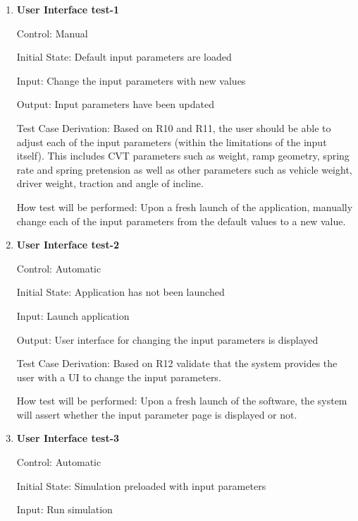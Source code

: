 \documentclass[12pt, titlepage]{article}
\begin{document}
\begin{enumerate}

  \item {} \hypertarget{User Interface test-1}{\textbf{User Interface test-1}} \label{User Interface test-1}
  
  Control: Manual

  Initial State: Default input parameters are loaded
            
  Input: Change the input parameters with new values
            
  Output: Input parameters have been updated 
  
  Test Case Derivation: Based on R10 and R11, the user should be able to adjust each of the input parameters (within the limitations of the input itself).
  This includes CVT parameters such as weight, ramp geometry, spring rate and spring pretension as well as other parameters such as vehicle weight, driver weight, traction and angle of incline. 
  
  How test will be performed: Upon a fresh launch of the application, manually change each of the input parameters from the default values to a new value. 
             
  \item {} \hypertarget{User Interface test-2}{\textbf{User Interface test-2}} \label{User Interface test-2}
 
  Control: Automatic
            
  Initial State: Application has not been launched
            
  Input: Launch application
            
  Output: User interface for changing the input parameters is displayed
  
  Test Case Derivation: Based on R12 validate that the system provides the user with a UI to change the input parameters.
  
  How test will be performed: Upon a fresh launch of the software, the system will assert whether the input parameter page is displayed or not. 
  \item {} \hypertarget{User Interface test-3}{\textbf{User Interface test-3}} \label{User Interface test-3}
  
  Control: Automatic
            
  Initial State: Simulation preloaded with input parameters
            
  Input: Run simulation 
            

\end{enumerate}
\end{document}
